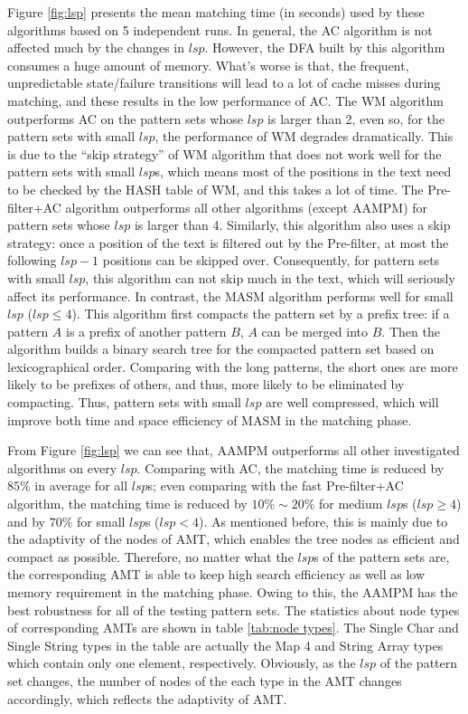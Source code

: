 \documentclass{article}
\begin{document}
Figure \ref{fig:lsp} presents the mean matching time (in seconds) used
by these algorithms based on 5 independent runs.  In general, the
\textsf{AC} algorithm is not affected much by the changes in $lsp$.
However, the DFA built by this algorithm consumes a huge amount of
memory. What's worse is that, the frequent, unpredictable
state/failure transitions will lead to a lot of cache misses during
matching, and these results in the low performance of \textsf{AC}. The
\textsf{WM} algorithm outperforms \textsf{AC} on the pattern sets
whose $lsp$ is larger than 2, even so, for the pattern sets with small
$lsp$, the performance of \textsf{WM} degrades dramatically. This is
due to the ``skip strategy'' of \textsf{WM} algorithm that does not
work well for the pattern sets with small $lsp$s, which means most of
the positions in the text need to be checked by the HASH table of
\textsf{WM}, and this takes a lot of time. The \textsf{Pre-filter+AC}
algorithm outperforms all other algorithms (except \textsf{AAMPM}) for
pattern sets whose $lsp$ is larger than 4. Similarly, this algorithm
also uses a skip strategy: once a position of the text is filtered out
by the Pre-filter, at most the following $lsp-1$ positions can be
skipped over. Consequently, for pattern sets with small $lsp$, this
algorithm can not skip much in the text, which will seriously affect
its performance. In contrast, the \textsf{MASM} algorithm performs
well for small $lsp$ ($lsp \leq 4$). This algorithm first compacts the
pattern set by a prefix tree: if a pattern $A$ is a prefix of another
pattern $B$, $A$ can be merged into $B$. Then the algorithm builds a
binary search tree for the compacted pattern set based on
lexicographical order. Comparing with the long patterns, the short
ones are more likely to be prefixes of others, and thus, more likely
to be eliminated by compacting. Thus, pattern sets with small $lsp$
are well compressed, which will improve both time and space efficiency
of \textsf{MASM} in the matching phase.

From Figure \ref{fig:lsp} we can see that, \textsf{AAMPM} outperforms
all other investigated algorithms on every $lsp$. Comparing with
\textsf{AC}, the matching time is reduced by $85\%$ in average for all
$lsp$s; even comparing with the fast \textsf{Pre-filter+AC} algorithm,
the matching time is reduced by $10\% \sim 20\%$ for medium $lsp$s
($lsp \geq 4$) and by $70\%$ for small $lsp$s ($lsp < 4$). As
mentioned before, this is mainly due to the adaptivity of the nodes of
AMT, which enables the tree nodes as efficient and compact as
possible. Therefore, no matter what the $lsp$s of the pattern sets
are, the corresponding AMT is able to keep high search efficiency as
well as low memory requirement in the matching phase. Owing to this,
the \textsf{AAMPM} has the best robustness for all of the testing
pattern sets. The statistics about node types of corresponding AMTs
are shown in table \ref{tab:node types}. The Single Char and Single
String types in the table are actually the Map 4 and String Array
types which contain only one element, respectively. Obviously, as the
$lsp$ of the pattern set changes, the number of nodes of the each type
in the AMT changes accordingly, which reflects the adaptivity of AMT.
\end{document}
